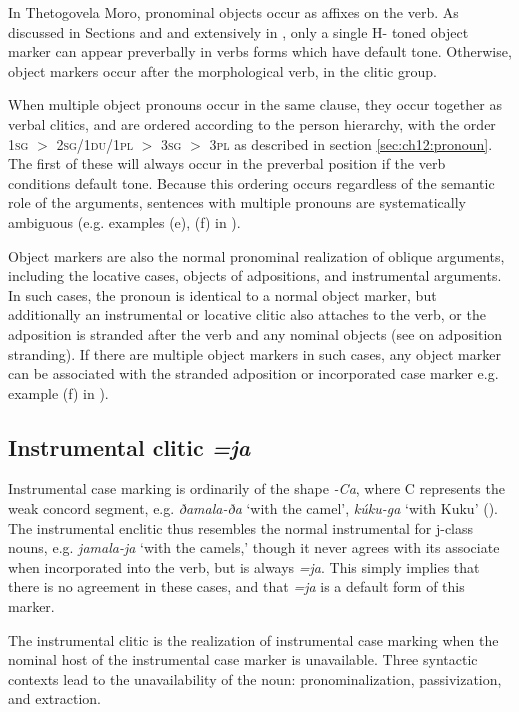 In Thetogovela Moro, pronominal objects occur as affixes on the verb. As discussed in Sections  and  and extensively in \citet{Jenks:2015}, only a single H- toned object marker can appear preverbally in verbs forms which have default tone. Otherwise, object markers occur after the morphological verb, in the clitic group.

When multiple object pronouns occur in the same clause, they occur together as verbal clitics, and are ordered according to the person hierarchy, with the order \textsc{1sg} $>$ \textsc{2sg/1du/1pl} $>$ \textsc{3sg} $>$ \textsc{3pl} as described in section \ref{sec:ch12:pronoun}. The first of these will always occur in the preverbal position if the verb conditions default tone. Because this ordering occurs regardless of the semantic role of the arguments, sentences with multiple pronouns are systematically ambiguous (e.g. examples (e), (f) in ).

Object markers are also the normal pronominal realization of oblique arguments, including the locative cases, objects of adpositions, and instrumental arguments. In such cases, the pronoun is identical to a normal object marker, but additionally an instrumental or locative clitic also attaches to the verb, or the adposition is stranded after the verb and any nominal objects  (see  on adposition stranding). If there are multiple object markers in such cases, any object marker can be associated with the stranded adposition or incorporated case marker e.g. example (f) in ).

\subsection{Instrumental clitic \textit{=ja}}\label{sec:ch11:instrumental}

Instrumental case marking is ordinarily of the shape \textit{-Ca}, where C represents the weak concord segment, e.g. \textit{ðamala-ða} `with the camel', \textit{kúku-ga} `with Kuku' (). The instrumental enclitic thus resembles the normal instrumental for j-class nouns, e.g. \textit{jamala-ja} `with the camels,' though it never agrees with its associate when incorporated into the verb, but is always \textit{=ja}. This simply implies that there is no agreement in these cases, and that \textit{=ja} is a default form of this marker.

The instrumental clitic is the realization of instrumental case marking when the nominal host of the instrumental case marker is unavailable. Three syntactic contexts lead to the unavailability of the noun: pronominalization, passivization, and extraction.


